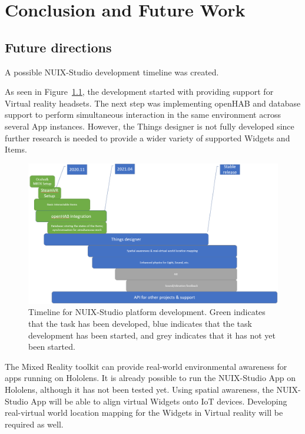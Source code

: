 
\chapter{Conclusion and Future Work}

\section{Future directions}

A possible NUIX-Studio development timeline was created.

As seen in Figure~\ref{fig:Timeline-figure}, the development started with providing support for Virtual reality headsets. The next step was implementing openHAB and database support to perform simultaneous interaction in the same environment across several App instances. However, the Things designer is not fully developed since further research is needed to provide a wider variety of supported Widgets and Items.

\begin{figure}
  \centering
  \includegraphics[width=0.9\linewidth]{figures/Timeline.png}
  \caption{Timeline for NUIX-Studio platform development. Green indicates that the task has been developed, blue indicates that the task development has been started, and grey indicates that it has not yet been started.}
  \label{fig:Timeline-figure}
\end{figure}

The Mixed Reality toolkit can provide real-world environmental awareness for apps running on Hololens. It is already possible to run the NUIX-Studio App on Hololens, although it has not been tested yet. Using spatial awareness, the NUIX-Studio App will be able to align virtual Widgets onto IoT devices. Developing real-virtual world location mapping for the Widgets in Virtual reality will be required as well.

